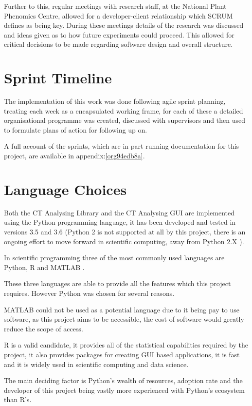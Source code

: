 \documentclass[11pt]{report}
\begin{document}
Further to this, regular meetings with research staff, at the National Plant Phenomics Centre,  allowed for a developer-client relationship which SCRUM defines as being key. During these meetings details of the research was discussed and ideas given as to how future experiments could proceed. This allowed for critical decisions to be made regarding software design and overall structure.
\section{Sprint Timeline}
\label{sec:org7dc5af7}
The implementation of this work was done following agile sprint planning, treating each week as a encapsulated working frame, for each of these a detailed organisational programme was created, discussed with supervisors and then used to formulate plans of action for following up on.

A full account of the sprints, which are in part running documentation for this project, are available in appendix:\ref{org94edb8a}.

\section{Language Choices}
\label{sec:orgc2df64f}
Both the CT Analysing Library and the CT Analysing GUI are implemented using the Python programming language, it has been developed and tested in versions 3.5 and 3.6 (Python 2 is not supported at all by this project, there is an ongoing effort to move forward in scientific computing, away from Python 2.X  \cite{Ozgur2016}).

In scientific programming three of the most commonly used languages are Python, R and MATLAB \cite{Ozgur2016}.

These three languages are able to provide all the features which this project requires. However Python was chosen for several reasons.

MATLAB could not be used as a potential language due to it being pay to use software, as this project aims to be accessible, the cost of software would greatly reduce the scope of access.

R is a valid candidate, it provides all of the statistical capabilities required by the project, it also provides packages for creating GUI based applications, it is fast and it is widely used in scientific computing and data science.

The main deciding factor is Python's wealth of resources, adoption rate and the developer of this project being vastly more experienced with Python's ecosystem than R's.
\end{document}
